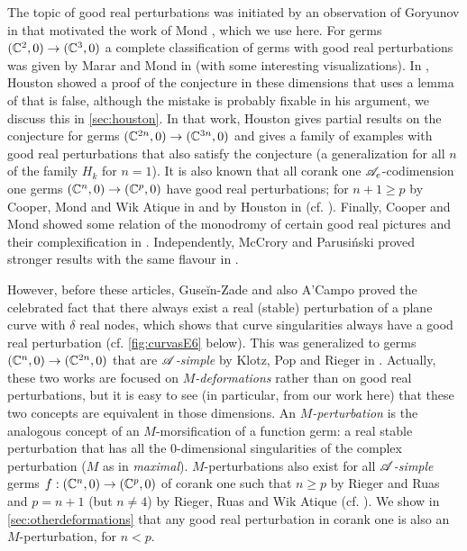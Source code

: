 \documentclass[a4paper,12pt]{amsart}
\begin{document}
The topic of good real perturbations was initiated by an observation of Goryunov in \cite{Goryunov1991} that motivated the work of Mond \cite{Mond1996}, which we use here. For germs $(\mathbb{C}^2,0)\to(\mathbb{C}^3,0)$ a complete classification of germs with good real perturbations was given by Marar and Mond in \cite{Marar1996} (with some interesting visualizations). In \cite{Houston2005}, Houston showed a proof of the conjecture in these dimensions that uses a lemma of \cite{Houston1997} that is false, although the mistake is probably fixable in his argument, we discuss this in \cref{sec:houston}. In that work, Houston gives partial results on the conjecture for germs $(\mathbb{C}^{2n},0)\to(\mathbb{C}^{3n},0)$ and gives a family of examples with good real perturbations that also satisfy the conjecture (a generalization for all $n$ of the family $H_k$ for $n=1$). It is also known that all corank one $\mathscr{A}_e$-codimension one germs $(\mathbb{C}^n,0)\to(\mathbb{C}^p,0)$ have good real perturbations; for $n+1\geq p$ by Cooper, Mond and Wik Atique in \cite{Cooper2002} and by Houston in \cite{Houston2005} (cf. \cite{Houston2002a,Cooper1993,Houston2005b}). Finally, Cooper and Mond showed some relation of the monodromy of certain good real pictures and their complexification in \cite{Cooper1998}. Independently, McCrory and Parusi\'nski proved stronger results with the same flavour in \cite{McCrory1997}.

However, before these articles, Guse\u{i}n-Zade \cite{GuseinZade1974} and also A'Campo \cite{ACampo1975} proved the celebrated fact that there always exist a real (stable) perturbation of a plane curve with $\delta$ real nodes, which shows that curve singularities always have a good real perturbation (cf. \cref{fig:curvasE6} below). This was generalized to germs $(\mathbb{C}^n,0)\to(\mathbb{C}^{2n},0)$ that are $\mathscr{A}$\textsl{-simple} by Klotz, Pop and Rieger in \cite{Klotz2007}. Actually, these two works are focused on \textsl{$M$-deformations} rather than on good real perturbations, but it is easy to see (in particular, from our work here) that these two concepts are equivalent in those dimensions. An \textit{$M$-perturbation} is the analogous concept of an $M$-morsification of a function germ: a real stable perturbation that has all the 0-dimensional singularities of the complex perturbation ($M$ as in \textsl{maximal}). $M$-perturbations also exist for all $\mathscr{A}$\textsl{-simple} germs $f:(\mathbb{C}^n,0)\to(\mathbb{C}^p,0)$ of corank one such that $n\geq p$ by Rieger and Ruas \cite{Rieger2005} and $p=n+1$ (but $n\neq4$) by Rieger, Ruas and Wik Atique \cite{Rieger2008a} (cf. \cite{Rieger2008}). We show in \cref{sec:otherdeformations} that any good real perturbation in corank one is also an $M$-perturbation, for $n<p$.
\end{document}
